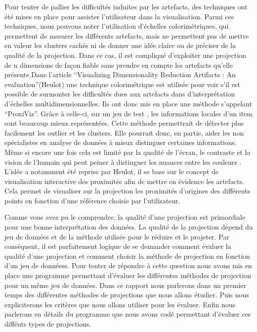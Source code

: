 \smallskip
Pour tenter de pallier les difficultés induites par les artefacts, des techniques ont été mises en place pour assister l’utilisateur dans la visualisation. Parmi ces techniques, nous pouvons noter l’utilisation d’échelles colorimétriques\cite{CheckViz}, qui permettent de mesurer les différents artefacts, mais ne permettent pas de mettre en valeur les clusters cachés ni de donner une idée claire ou de préciser de la qualité de la projection. 
Dans ce cas, il est compliqué d’exploiter une projection de n dimensions de façon fiable sans prendre en compte les artefacts qu’elle présente\cite{aupetit2007visualizing}.Dans l’article “Visualizing Dimensionality Reduction Artifacts : An evaluation”(Heulot) 
une technique colorimétrique est utilisée pour voir s’il est possible de surmonter les difficultés dues aux artefacts dans d’interprétation d’échelles multidimensionnelles. Ils ont donc mis en place une méthode s'appelant “ProxiViz”. Grâce à celle-ci, sur un jeu de test , les informations locales d’un item sont beaucoup mieux représentées. Cette méthode permettrait de détecter plus facilement les outlier et les clusters. 
Elle pourrait donc, en partie, aider les non spécialistes en analyse de données à mieux distinguer certaines informations. Même si encore une fois cela est limité par la qualité de l’écran, le contraste et la vision de l'humain qui peut peiner à distinguer les nuances entre les couleurs\cite{HeulotAnEvaluation} \cite{tran2021approaching} \cite{deering1998human_vision}.
L’idée a notamment été reprise par Heulot\cite{HeulotThese}, il se base sur le concept de visualisation interactive des proximités afin de mettre en évidence les artefacts. Cela permet de visualiser sur la projection les proximités d’origines des différents points en fonction d’une référence choisie par l’utilisateur.

\medskip
Comme vous avez pu le comprendre, la qualité d'une projection est primordiale pour une bonne interprétation des données. La qualité de la projection dépend du jeu de données et de la méthode utilisée pour le réduire et le projeter.
Par conséquent, il est parfaitement logique de se demander comment évaluer la qualité d'une projection et comment choisir la méthode de projection en fonction d'un jeu de donnéess.
Pour tenter de répondre à cette question nous avons mis en place une programme permettant d'évaluer les différentes méthodes de projection pour un même jeu de données.
Dans ce rapport nous parlerons dans un premier temps des différentes méthodes de projections que nous allons étudier. Puis nous expliciterons les critères que nous allons utiliser pour les évaluer.
Enfin nous parlerons en détails du programme que nous avons codé permettant d'évaluer ces diffénts types de projections.



        







